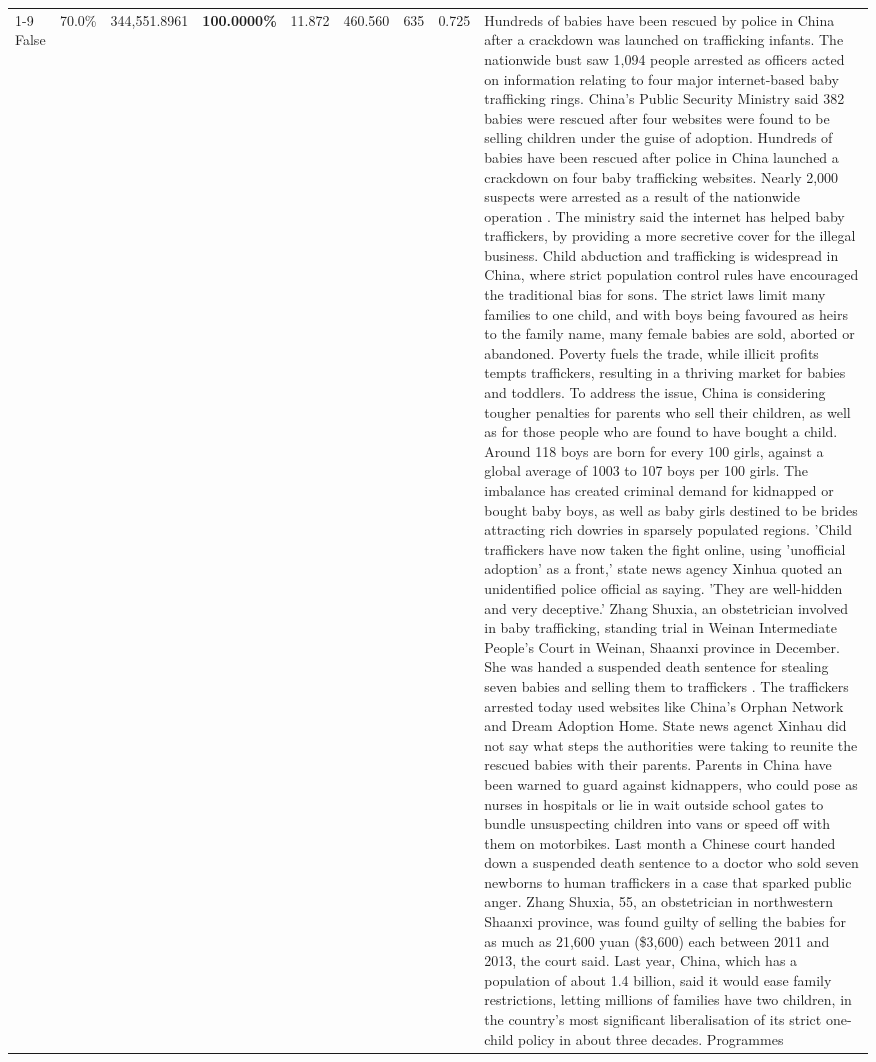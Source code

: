 \begin{table}[H]
\begin{tabular}{lllrlllll}
\cline{1-9}
False & 70.0\% & 344,551.8961 & \bfseries \color{red} 100.0000\% & 11.872 & 460.560 & 635 & 0.725 & Hundreds of babies have been rescued by police in China after a crackdown was launched on trafficking infants. The nationwide bust saw 1,094 people arrested as officers acted on information relating to four major internet-based baby trafficking rings. China's Public Security Ministry said 382 babies were rescued after four websites were found to be selling children under the guise of adoption. Hundreds of babies have been rescued after police in China launched a crackdown on four baby trafficking websites. Nearly 2,000 suspects were arrested as a result of the nationwide operation . The ministry said the internet has helped baby traffickers, by providing a more secretive cover for the illegal business. Child abduction and trafficking is widespread in China, where strict population control rules have encouraged the traditional bias for sons. The strict laws limit many families to one child, and with boys being favoured as heirs to the family name, many female babies are sold, aborted or abandoned. Poverty fuels the trade, while illicit profits tempts traffickers, resulting in a thriving market for babies and toddlers. To address the issue, China is considering tougher penalties for parents who sell their children, as well as for those people who are found to have bought a child. Around 118 boys are born for every 100 girls, against a global average of 1003 to 107 boys per 100 girls. The imbalance has created criminal demand for kidnapped or bought baby boys, as well as baby girls destined to be brides attracting rich dowries in sparsely populated regions. 'Child traffickers have now taken the fight online, using 'unofficial adoption' as a front,' state news agency Xinhua quoted an unidentified police official as saying. 'They are well-hidden and very deceptive.' Zhang Shuxia, an obstetrician involved in baby trafficking, standing trial in Weinan Intermediate People's Court in Weinan, Shaanxi province in December. She was handed a suspended death sentence for stealing seven babies and selling them to traffickers . The traffickers arrested today used websites like China's Orphan Network and Dream Adoption Home. State news agenct Xinhau did not say what steps the authorities were taking to reunite the rescued babies with their parents. Parents in China have been warned to guard against kidnappers, who could pose as nurses in hospitals or lie in wait outside school gates to bundle unsuspecting children into vans or speed off with them on motorbikes. Last month a Chinese court handed down a suspended death sentence to a doctor who sold seven newborns to human traffickers in a case that sparked public anger. Zhang Shuxia, 55, an obstetrician in northwestern Shaanxi province, was found guilty of selling the babies for as much as 21,600 yuan (\$3,600) each between 2011 and 2013, the court said. Last year, China, which has a population of about 1.4 billion, said it would ease family restrictions, letting millions of families have two children, in the country's most significant liberalisation of its strict one-child policy in about three decades. Programmes \\

\end{tabular}
\end{table}
